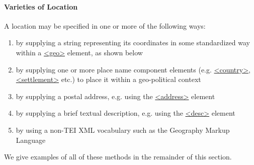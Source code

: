 \paragraph[{Varieties of Location}]{Varieties of Location}\label{NDGEOGva}\par
A location may be specified in one or more of the following ways: \begin{enumerate}
\item by supplying a string representing its coordinates in some standardized way within a \hyperref[TEI.geo]{<geo>} element, as shown below
\item by supplying one or more place name component elements (e.g. \hyperref[TEI.country]{<country>}, \hyperref[TEI.settlement]{<settlement>} etc.) to place it within a geo-political context
\item by supplying a postal address, e.g. using the \hyperref[TEI.address]{<address>} element
\item by supplying a brief textual description, e.g. using the \hyperref[TEI.desc]{<desc>} element
\item by using a non-TEI XML vocabulary such as the Geography Markup Language
\end{enumerate} We give examples of all of these methods in the remainder of this section.\par
